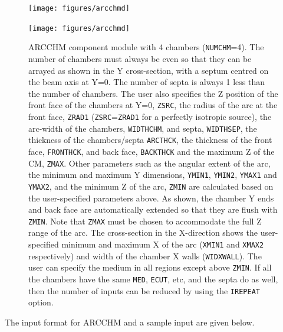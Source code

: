 \documentclass[12pt,twoside]{article}
\begin{document}
\begin{figure}[htbp]
\leavevmode
\begin{latexonly}
\hspace{-5cm}\texttt{[image: figures/arcchmd]}
\end{latexonly}
\begin{htmlonly}
\texttt{[image: figures/arcchmd]}
\end{htmlonly}
\caption[ARCCHM CM geometry.]
{ARCCHM component module with 4 chambers ({\tt NUMCHM}=4).  The number of
chambers must always be even so that they can be arrayed as shown in
the Y cross-section, with a
septum centred on the beam axis at Y=0.  The number of septa is always 1 less
than the number of chambers.  The user also specifies the Z position of the
front face of the chambers at Y=0, {\tt ZSRC}, the radius of the arc at the
front face, {\tt ZRAD1} ({\tt ZSRC}={\tt ZRAD1} for a perfectly isotropic
source), the arc-width of the chambers, {\tt WIDTHCHM}, and
septa, {\tt WIDTHSEP}, the thickness of the chambers/septa {\tt ARCTHCK},
the thickness of the front face, {\tt FRONTHCK}, and back face, {\tt BACKTHCK}
and the maximum Z of the CM, {\tt ZMAX}.  Other parameters such as the
angular extent of the arc, the minimum and maximum Y dimensions, {\tt YMIN1},
{\tt YMIN2}, {\tt YMAX1} and {\tt YMAX2}, and the minimum Z of the arc,
{\tt ZMIN} are calculated based on the user-specified parameters above.  As shown,
the chamber Y ends and back face are automatically extended so that they
are flush with {\tt ZMIN}.  Note that {\tt ZMAX} must be chosen
to accommodate the full Z range of the arc.  The cross-section in the X-direction
shows the user-specified minimum and maximum X of the arc ({\tt XMIN1} and
{\tt XMAX2} respectively) and width of the chamber X walls ({\tt WIDXWALL}).
The user can specify the medium in all regions except above {\tt ZMIN}.  If
all the chambers have the same {\tt MED}, {\tt ECUT}, etc, and the septa do
as well, then the number of inputs can be reduced by using the {\tt IREPEAT}
option.}
\label{fig_ARCCHMD}
\end{figure}
\clearpage

The input format for ARCCHM and a sample input are given below.

\begin{small}

\end{small}


\end{document}
